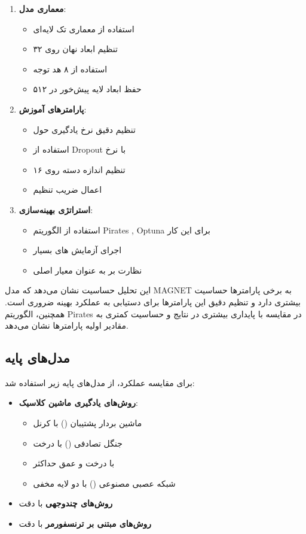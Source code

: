 \begin{enumerate}
    \item \textbf{معماری مدل}:
    \begin{itemize}
        \item استفاده از معماری تک لایه‌ای
        \item تنظیم ابعاد نهان روی ۳۲
        \item استفاده از ۸ هد توجه
        \item حفظ ابعاد لایه پیش‌خور در ۵۱۲
    \end{itemize}
    
    \item \textbf{پارامترهای آموزش}:
    \begin{itemize}
        \item تنظیم دقیق نرخ یادگیری حول 
        \item استفاده از Dropout با نرخ 
        \item تنظیم اندازه دسته روی ۱۶
        \item اعمال ضریب تنظیم 
    \end{itemize}
    
    \item \textbf{استراتژی بهینه‌سازی}:
    \begin{itemize}
        \item استفاده از الگوریتم Pirates , Optuna برای این کار 
        \item اجرای آزمایش های بسیار
        \item نظارت بر  به عنوان معیار اصلی
    \end{itemize}
\end{enumerate}

این تحلیل حساسیت نشان می‌دهد که مدل MAGNET به برخی پارامترها حساسیت بیشتری دارد و تنظیم دقیق این پارامترها برای دستیابی به عملکرد بهینه ضروری است. همچنین، الگوریتم Pirates در مقایسه با  پایداری بیشتری در نتایج و حساسیت کمتری به مقادیر اولیه پارامترها نشان می‌دهد.


\subsection{مدل‌های پایه}
برای مقایسه عملکرد، از مدل‌های پایه زیر استفاده شد:
\begin{itemize}
    \item \textbf{روش‌های یادگیری ماشین کلاسیک}:
    \begin{itemize}
        \item ماشین بردار پشتیبان () با کرنل 
        \item جنگل تصادفی () با  درخت
        \item {} با  درخت و عمق حداکثر 
        \item شبکه عصبی مصنوعی () با دو لایه مخفی
    \end{itemize}
    \item \textbf{روش‌های چندوجهی} با دقت  \cite{Alsaleh2023}
    \item \textbf{روش‌های مبتنی بر ترنسفورمر} با دقت  \cite{TransformerMalware}
\end{itemize}

